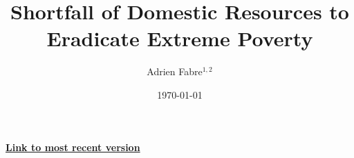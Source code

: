 

% 



% 
% 

% 


\title{Shortfall of Domestic Resources to Eradicate Extreme Poverty} 

\author{Adrien Fabre$^{1,2}$} %

\date{\today} %



\sloppy
\maketitle

\begin{center}
{\textbf{\href{https://github.com/bixiou/domestic_poverty_eradication/raw/main/paper/poverty.pdf}{Link to most recent version}}}
\end{center}


